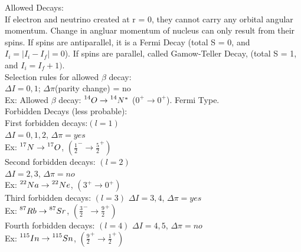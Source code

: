 \documentclass{article}
\begin{document}
\begin{multicols}{3}
Allowed Decays:\\
If electron and neutrino created at r = 0, they cannot carry any orbital angular momentum.  Change in angluar momentum of nucleus can only result from their spins.  If spins are antiparallel, it is a Fermi Decay (total S = 0, and $I_{i} = |I_{i} - I_{f}| = 0$).  If spins are parallel, called Gamow-Teller Decay, (total S = 1, and $I_{i} = I_{f} + 1)$.\\
Selection rules for allowed $\beta$ decay:\\
$\Delta I = 0,1$; $\Delta \pi$(parity change) = no\\
Ex:  Allowed $\beta$ decay: $\prescript{14}{}{O} \rightarrow \prescript{14}{}{N}^{*}$ ($0^{+} \rightarrow 0^{+}$).  Fermi Type.\\

Forbidden Decays (less probable):\\
First forbidden decays:$(l=1)$\\
\hspace*{0.01\textwidth} $\Delta I = 0,1,2$, $\Delta \pi = yes$\\
\hspace*{0.01\textwidth} Ex: $\prescript{17}{}{N} \rightarrow \prescript{17}{}{O}$, $(\frac{1}{2}^{-} \rightarrow \frac{5}{2}^{+})$\\
Second forbidden decays: $(l=2)$\\


\hspace*{0.01\textwidth} $\Delta I = 2,3$, $\Delta \pi = no$\\
\hspace*{0.01\textwidth} Ex: $\prescript{22}{}{Na} \rightarrow \prescript{22}{}{Ne}$, $(3^{+} \rightarrow 0^{+})$\\
Third forbidden decays: $(l=3)$ 
\hspace*{0.01\textwidth} $\Delta I = 3,4$, $\Delta \pi = yes$\\
\hspace*{0.01\textwidth} Ex: $\prescript{87}{}{Rb} \rightarrow \prescript{87}{}{Sr}$, $(\frac{3}{2}^{-} \rightarrow \frac{9}{2}^{+})$\\
Fourth forbidden decays: $(l=4)$
\hspace*{0.01\textwidth} $\Delta I = 4,5$, $\Delta \pi = no$\\
\hspace*{0.01\textwidth} Ex: $\prescript{115}{}{In} \rightarrow \prescript{115}{}{Sn}$, $(\frac{9}{2}^{+} \rightarrow \frac{1}{2}^{+})$\\


\end{multicols}
\end{document}
